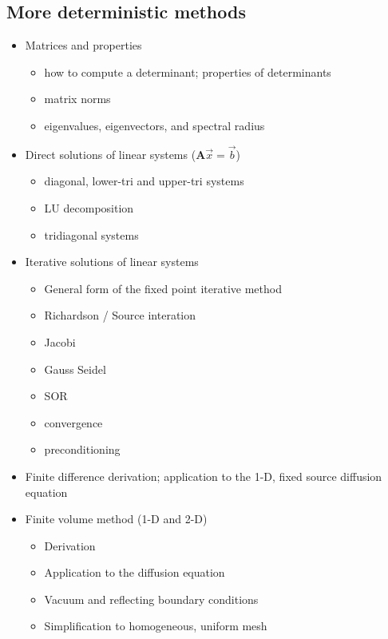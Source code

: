 \documentclass[12pt]{article}
\newcommand{\ve}[1]{\ensuremath{\mathbf{#1}}}
\begin{document}
\subsection*{More deterministic methods}
\begin{itemize}
\item Matrices and properties
  \begin{itemize}
  \item how to compute a determinant; properties of determinants
  \item matrix norms
  \item eigenvalues, eigenvectors, and spectral radius
  \end{itemize}

\item Direct solutions of linear systems ($\ve{A}\vec{x} = \vec{b}$)
  \begin{itemize}
  \item diagonal, lower-tri and upper-tri systems
  \item LU decomposition
  \item tridiagonal systems
  \end{itemize}

\item Iterative solutions of linear systems
  \begin{itemize}
  \item General form of the fixed point iterative method
  \item Richardson / Source interation
  \item Jacobi
  \item Gauss Seidel
  \item SOR
  \item convergence
  \item preconditioning
  \end{itemize}


\item Finite difference derivation; application to the 1-D, fixed source diffusion equation
\item Finite volume method (1-D and 2-D)
  \begin{itemize}
  \item Derivation
  \item Application to the diffusion equation
  \item Vacuum and reflecting boundary conditions
  \item Simplification to homogeneous, uniform mesh
  \end{itemize}
  

\end{itemize}
\end{document}

